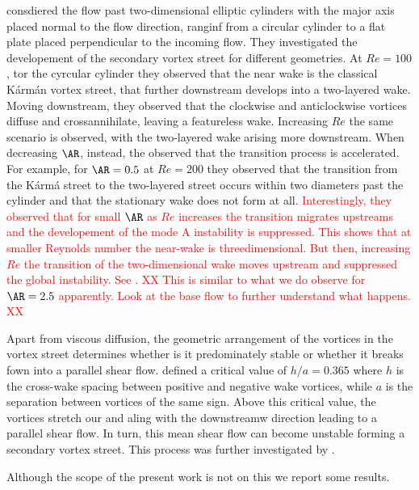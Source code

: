 \cite{thompson-etal-2014} consdiered the flow past two-dimensional elliptic cylinders with the major axis placed normal to the flow direction, ranginf from a circular cylinder to a flat plate placed perpendicular to the incoming flow. They investigated the developement of the secondary vortex street for different geometries. At $Re=100$, tor the cyrcular cylinder they observed that the near wake is the classical K\'{a}rm\'{a}n vortex street, that further downstream develops into a two-layered wake. Moving downstream, they observed that the clockwise and anticlockwise vortices diffuse and crossannihilate, leaving a featureless wake. Increasing $Re$ the same scenario is observed, with the two-layered wake arising more downstream. When decreasing $\AR$, instead, the observed that the transition process is accelerated. For example, for $\AR=0.5$ at $Re=200$ they observed that the transition from the K\'{a}rm\'{a} street to the two-layered street occurs within two diameters past the cylinder and that the stationary wake does not form at all. \textcolor{red}{Interestingly, they observed that for small $\AR$ as $Re$ increases the transition migrates upstreams and the developement of the mode A instability is suppressed. This shows that at smaller Reynolds number the near-wake is threedimensional. But then, increasing $Re$ the transition of the two-dimensional wake moves upstream and suppressed the global instability. See \citep{radi-etal-2013}. XX This is similar to what we do observe for $\AR=2.5$ apparently. Look at the base flow to further understand what happens. XX}


\cite{jhonson-thompson-hourigan-2004}

\cite{alksyuk-shkadova-shkadov-2012}

Apart from viscous diffusion, the geometric arrangement of the vortices in the vortex street determines whether is it predominately stable or whether it breaks fown into a parallel shear flow. \cite{durgin-karlsson-1971} defined a critical value of $h/a = 0.365$ where $h$ is the cross-wake spacing between positive and negative wake vortices, while $a$ is the separation between vortices of the same sign. Above this critical value, the vortices stretch our and aling with the downstreamw direction leading to a parallel shear flow. In turn, this mean shear flow can become unstable forming a secondary vortex street. This process was further investigated by \cite{karasudani-funakoshi-1994}.

Although the scope of the present work is not on this we report some results.

